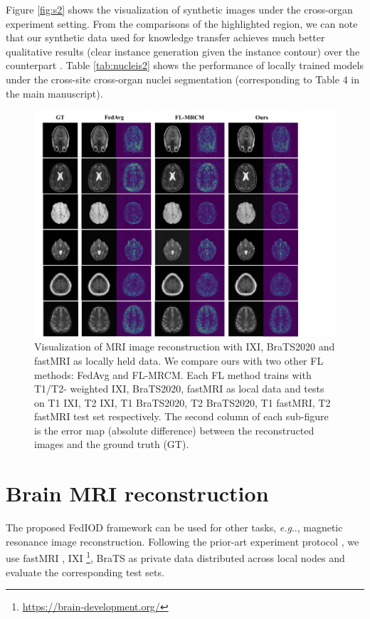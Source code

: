 \documentclass[letterpaper]{article} %
\makeatletter
\DeclareRobustCommand\onedot{\futurelet\@let@token\@onedot}
\def\@onedot{\ifx\@let@token.\else.\null\fi\xspace}
\def\eg{\emph{e.g}\onedot} \def\Eg{\emph{E.g}\onedot}
\makeatother
\begin{document}
Figure \ref{fig:s2} shows the visualization of synthetic images under the cross-organ experiment setting. From the comparisons of the highlighted region, we can note that our synthetic data used for knowledge transfer achieves much better qualitative results (clear instance generation given the instance contour) over the counterpart \cite{chang2020synthetic}. Table \ref{tab:nucleis2} shows the performance of locally trained models under the cross-site cross-organ nuclei segmentation (corresponding to Table 4 in the main manuscript).

\begin{figure}
\centering
\includegraphics[width=\linewidth]{fig/sfig3.pdf}
\caption{Visualization of MRI image reconstruction with IXI, BraTS2020 and fastMRI as locally held data. We compare ours with two other FL methods: FedAvg and FL-MRCM. Each FL method trains with T1/T2-
weighted IXI, BraTS2020, fastMRI as local data and tests on T1  IXI, T2  IXI, T1 BraTS2020, T2 BraTS2020, T1 fastMRI, T2 fastMRI test set respectively. The second column of each sub-figure is the error map (absolute difference) between the reconstructed images and the ground truth (GT).
}

\label{fig:s3}
\end{figure}


\section{Brain MRI reconstruction}
The proposed FedIOD framework can be used for other tasks, \eg, magnetic resonance image reconstruction. Following the prior-art experiment protocol \cite{Guo_2021_CVPR, gong2022federated}, we use fastMRI \cite{zbontar2018fastMRI}, IXI \footnote{\url{https://brain-development.org/}}, BraTS\cite{hdtd-5j88-20} as private data distributed across local nodes and evaluate the corresponding test sets. 
\end{document}

